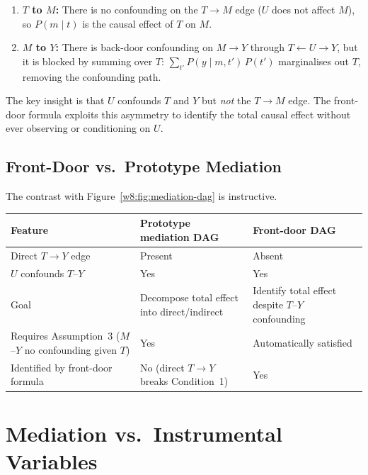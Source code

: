 \documentclass[master.tex]{subfiles}
\begin{document}
\begin{enumerate}
  \item \textbf{$T$ to $M$:}  There is no confounding on the $T \to M$
    edge ($U$ does not affect $M$), so $P(m \mid t)$ is the causal
    effect of $T$ on $M$.
  \item \textbf{$M$ to $Y$:}  There is back-door confounding on $M \to Y$
    through $T \leftarrow U \to Y$, but it is blocked by summing over
    $T$: $\sum_{t'} P(y \mid m, t')\, P(t')$ marginalises out $T$,
    removing the confounding path.
\end{enumerate}

The key insight is that $U$ confounds $T$ and $Y$ but \emph{not} the
$T \to M$ edge.  The front-door formula exploits this asymmetry to
identify the total causal effect without ever observing or conditioning
on $U$.

\subsection{Front-Door vs.\ Prototype Mediation}

The contrast with Figure~\ref{w8:fig:mediation-dag} is instructive.

\medskip
\begin{center}
\renewcommand{\arraystretch}{1.4}
\begin{tabular}{p{3.5cm} p{4.5cm} p{4.5cm}}
\toprule
\textbf{Feature}
  & \textbf{Prototype mediation DAG}
  & \textbf{Front-door DAG} \\
\midrule
Direct $T \to Y$ edge
  & Present
  & Absent \\
$U$ confounds $T$--$Y$
  & Yes
  & Yes \\
Goal
  & Decompose total effect into direct/indirect
  & Identify total effect despite $T$--$Y$ confounding \\
Requires Assumption~3 ($M$--$Y$ no confounding given $T$)
  & Yes
  & Automatically satisfied \\
Identified by front-door formula
  & No (direct $T \to Y$ breaks Condition~1)
  & Yes \\
\bottomrule
\end{tabular}
\end{center}

\section{Mediation vs.\ Instrumental Variables}
\label{w8:sec:mediation-vs-iv}
\end{document}
